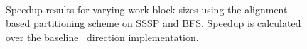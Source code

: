 \begin{figure}[!ht]
    \centering
     \\
    \caption{Speedup results for varying work block sizes using the alignment-based partitioning scheme on SSSP and BFS. Speedup is calculated over the baseline \pull~direction implementation.}
    \label{pap:generals:sec:eval:fig:cache}
\end{figure}

